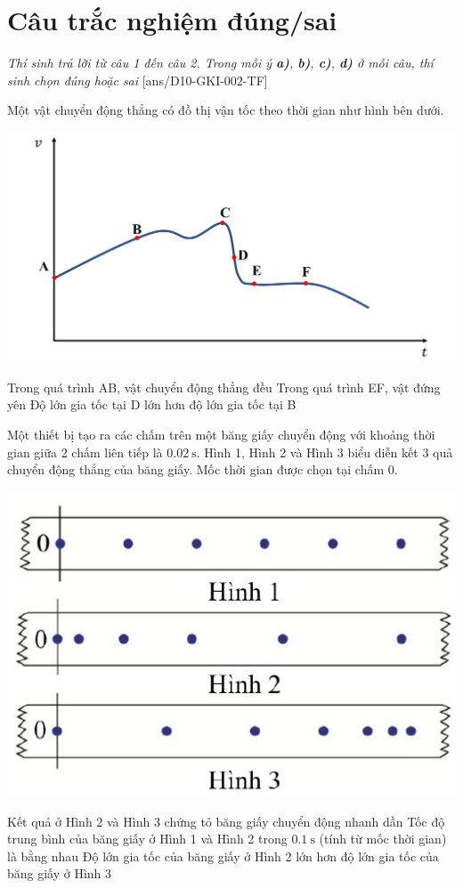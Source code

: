 \section{Câu trắc nghiệm đúng/sai} 
\textit{Thí sinh trả lời từ câu 1 đến câu 2. Trong mỗi ý \textbf{a)}, \textbf{b)}, \textbf{c)}, \textbf{d)} ở mỗi câu, thí sinh chọn đúng hoặc sai}
\setcounter{ex}{0}
[ans/D10-GKI-002-TF]
\begin{ex}
	Một vật chuyển động thẳng có đồ thị vận tốc theo thời gian như hình bên dưới.
	\begin{center}
		\includegraphics[width=0.7\linewidth]{../figs/D10-2-8}
	\end{center}
	{Trong quá trình AB, vật chuyển động thẳng đều}
	{Trong quá trình EF, vật đứng yên}
	{\True Độ lớn gia tốc tại D lớn hơn độ lớn gia tốc tại B}
	\loigiai{}
\end{ex}

\begin{ex}
	Một thiết bị tạo ra các chấm trên một băng giấy chuyển động với khoảng thời gian giữa 2 chấm liên tiếp là $\SI{0.02}{\second}$. Hình 1, Hình 2 và Hình 3 biểu diễn kết 3 quả chuyển động thẳng của băng giấy. Mốc thời gian được chọn tại chấm 0.
	\begin{center}
		\includegraphics[width=0.4\linewidth]{../figs/D10-2-9}
	\end{center}
	{Kết quả ở Hình 2 và Hình 3 chứng tỏ băng giấy chuyển động nhanh dần}
	{\True Tốc độ trung bình của băng giấy ở Hình 1 và Hình 2 trong $\SI{0.1}{\second}$ (tính từ mốc thời gian) là bằng nhau}
	{Độ lớn gia tốc của băng giấy ở Hình 2 lớn hơn độ lớn gia tốc của băng giấy ở Hình 3}
\end{ex}

